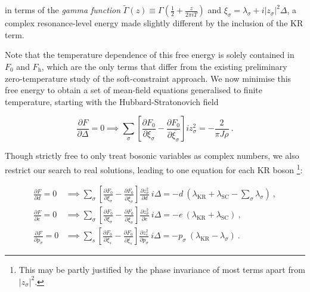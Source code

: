 \documentclass[12pt]{article}
\begin{document}
in terms of the \textit{gamma function} $ \widetilde{\Gamma} (z) \equiv \Gamma (\frac{1}{2} + \frac{z}{2 \pi i T}) $ and $ \xi_{\sigma} = \lambda_{\sigma} + i |z_{\sigma}|^2 \Delta $, a complex resonance-level energy made slightly different by the inclusion of the KR term.


Note that the temperature dependence of this free energy is solely contained in $ F_0 $ and $ F_{\text{h}} $, which are the only terms that differ from the existing preliminary zero-temperature study of the soft-constraint approach. We now minimise this free energy to obtain a set of mean-field equations generalised to finite temperature, starting with the Hubbard-Stratonovich field

\begin{equation}
\frac{\partial F}{\partial \Delta} = 0 \implies \sum_{\sigma} \left[ \frac{\partial F_{0}}{\partial \xi_{\sigma}} - \frac{\partial F_{0}}{\partial \overline{\xi_{\sigma}}} \right] i z^2_{\sigma} = - \frac{2}{\pi J \rho} ~ .
\label{eq:MF_delta}
\end{equation}

Though strictly free to only treat bosonic variables as complex numbers, we also restrict our search to real solutions, leading to one equation for each KR boson \footnote{This may be partly justified by the phase invariance of most terms apart from $ | z_{\sigma} |^2 $.}: %

\begin{align}
\frac{\partial F}{\partial d} = 0 &\implies \sum_{\sigma} \left[ \frac{\partial F_{0}}{\partial \xi_{\sigma}} - \frac{\partial F_{0}}{\partial \overline{\xi_{\sigma}}} \right] \frac{\partial z^2_{\sigma}}{\partial d} ~ i \Delta = -d ~ ( \lambda_{\text{KR}} + \lambda_{\text{SC}} -  \sum_{\sigma} \lambda_{\sigma} ) ~ , \label{eq:MF_d} \\
\frac{\partial F}{\partial e} = 0 &\implies \sum_{\sigma} \left[ \frac{\partial F_{0}}{\partial \xi_{\sigma}} - \frac{\partial F_{0}}{\partial \overline{\xi_{\sigma}}} \right] \frac{\partial z^2_{\sigma}}{\partial e} ~ i \Delta = -e ~ ( \lambda_{\text{KR}} + \lambda_{\text{SC}} ) ~ , \label{eq:MF_e} \\
\frac{\partial F}{\partial p_{\sigma}} = 0 &\implies \sum_{s} \left[ \frac{\partial F_{0}}{\partial \xi_{s}} - \frac{\partial F_{0}}{\partial \overline{\xi_{s}}} \right] \frac{\partial z^2_{s}}{\partial p_{\sigma}} ~ i \Delta = - p_{\sigma} ~ (\lambda_{\text{KR}} - \lambda_{\sigma}) ~ . \label{eq:MF_p}
\end{align}
\end{document}
